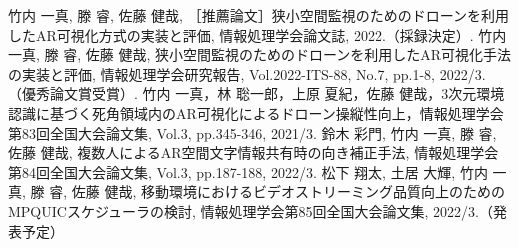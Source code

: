 \documentclass[a4paper,11pt]{ujreport}
\begin{document}
\begin{thebibliography}{99}
  \bibitem{} 竹内 一真, 滕 睿, 佐藤 健哉, ［推薦論文］狭小空間監視のためのドローンを利用したAR可視化方式の実装と評価, 情報処理学会論文誌, 2022.（採録決定）.
  \bibitem{} 竹内 一真, 滕 睿, 佐藤 健哉, 狭小空間監視のためのドローンを利用したAR可視化手法の実装と評価, 情報処理学会研究報告, Vol.2022-ITS-88, No.7, pp.1-8, 2022/3.（優秀論文賞受賞）.
  \bibitem{} 竹内 一真，林 聡一郎，上原 夏紀，佐藤 健哉，3次元環境認識に基づく死角領域内のAR可視化によるドローン操縦性向上，情報処理学会第83回全国大会論文集, Vol.3, pp.345-346, 2021/3.
  \bibitem{} 鈴木 彩門, 竹内 一真, 滕 睿, 佐藤 健哉, 複数人によるAR空間文字情報共有時の向き補正手法, 情報処理学会第84回全国大会論文集, Vol.3, pp.187-188, 2022/3.
  \bibitem{} 松下 翔太, 土居 大輝, 竹内 一真, 滕 睿, 佐藤 健哉, 移動環境におけるビデオストリーミング品質向上のためのMPQUICスケジューラの検討, 情報処理学会第85回全国大会論文集, 2022/3.（発表予定）
\end{thebibliography}

\clearpage

\end{document}
